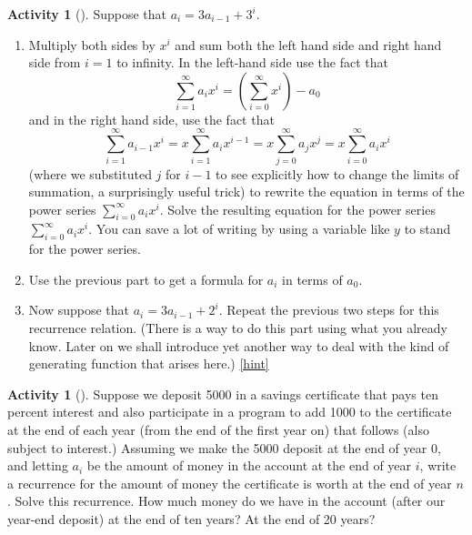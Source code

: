 \documentclass[10pt,]{book}
\theoremstyle{plain}
\theoremstyle{definition}
\theoremstyle{definition}
\theoremstyle{definition}
\newtheorem{activity}[project]{Activity}
\numberwithin{equation}{chapter}
\begin{document}
\begin{activity}[]\label{substituteandsolve}
\hypertarget{p-1334}{}%
Suppose that \(a_i=3a_{i-1} + 3^i\).%
\begin{enumerate}[font=\bfseries,label=(\alph*),ref=\alph*]
\item\label{task-244} \hypertarget{p-1335}{}%
Multiply both sides by \(x^i\) and sum both the left hand side and right hand side from \(i=1\) to infinity.  In the left-hand side use the fact that%
\begin{equation*}
\sum_{i=1}^\infty a_ix^i = (\sum_{i=0}^\infty x^i) -a_0
\end{equation*}
and in the right hand side, use the fact that%
\begin{equation*}
\sum_{i=1}^\infty a_{i-1}x^i = x\sum_{i=1}^\infty a_ix^{i-1}
=x\sum_{j=0}^\infty a_jx^j =x\sum_{i=0}^\infty a_ix^i
\end{equation*}
(where we substituted \(j\) for \(i-1\) to see explicitly how to change the limits of summation, a surprisingly useful trick) to rewrite the equation in terms of the power series \(\sum_{i=0}^\infty a_ix^i\).  Solve the resulting equation for the power series \(\sum_{i=0}^\infty a_ix^i\). You can save a lot of writing by using a variable like \(y\) to stand for the power series.%
\item\label{task-245} \hypertarget{p-1337}{}%
Use the previous part to get a formula for \(a_i\) in terms of \(a_0\).%
\item\label{task-246} \hypertarget{p-1339}{}%
Now suppose that \(a_i=3a_{i-1} + 2^i\).  Repeat the previous two steps for this recurrence relation.  (There is a way to do this part using what you already know.  Later on we shall introduce yet another way to deal with the kind of generating function that arises here.)%
\hfill{\tiny\hyperlink{a-258.c}{[hint]}\hypertarget{q-258.c}{}}\end{enumerate}
\end{activity}
\begin{activity}[]\label{activity-252}
\hypertarget{p-1342}{}%
Suppose we deposit \textdollar{}5000 in a savings certificate that pays ten percent interest and also participate in a program to add \textdollar{}1000 to the certificate at the end of each year (from the end of the first year on) that follows (also subject to interest.) Assuming we make the \textdollar{}5000 deposit at the end of year 0, and letting \(a_i\) be the amount of money in the account at the end of year \(i\), write a recurrence for the amount of money the certificate is worth at the end of year \(n\). Solve this recurrence. How much money do we have in the account (after our year-end deposit) at the end of ten years?  At the end of 20 years?%
\end{activity}
\typeout{************************************************}
\typeout{************************************************}
\end{document}
